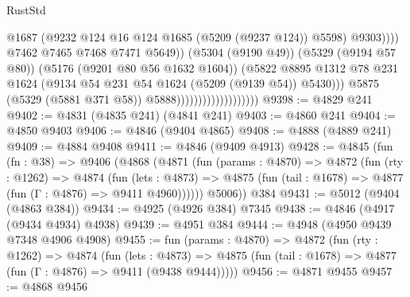 \begin{lexlean}{RustStd}
\begin{coremodule}
                                                        @1687
                                                        (@9232
                                                          @124
                                                          @16
                                                          @124
                                                          @1685
                                                          (@5209 (@9237 @124))
                                                          @5598)
                                                        @9303))))
                                                @7462
                                                @7465
                                                @7468
                                                @7471
                                                @5649))
                                            (@5304 (@9190 @49))
                                            (@5329 (@9194 @57 @80))
                                            (@5176 (@9201 @80 @56 @1632 @1604))
                                            (@5822
                                              @8895
                                              @1312
                                              @78
                                              @231
                                              @1624
                                              (@9134 @54 @231 @54 @1624 (@5209 (@9139 @54)) @5430)))
                                          @5875
                                          (@5329 (@5881 @371 @58))
                                          @5888)))))))))))))))))))
@9398 := @4829 @241
@9402 := @4831 (@4835 @241) (@4841 @241)
@9403 := @4860 @241
@9404 := @4850 @9403
@9406 := @4846 (@9404 @4865)
@9408 := @4888 (@4889 @241)
@9409 := @4884 @9408
@9411 := @4846 (@9409 @4913)
@9428 := @4845
    (fun (fn : @38) =>
    @9406
      (@4868
        (@4871
          (fun (params : @4870) =>
          @4872
            (fun (rty : @1262) =>
            @4874
              (fun (lets : @4873) =>
              @4875 (fun (tail : @1678) => @4877 (fun (Γ : @4876) => @9411 @4960))))))
        @5006))
    @384
@9431 := @5012 (@9404 (@4863 @384))
@9434 := @4925 (@4926 @384) @7345
@9438 := @4846 (@4917 (@9434 @4934) @4938)
@9439 := @4951 @384
@9444 := @4948 (@4950 @9439 @7348 @4906 @4908)
@9455 := fun (params : @4870) =>
  @4872
    (fun (rty : @1262) =>
    @4874
      (fun (lets : @4873) =>
      @4875 (fun (tail : @1678) => @4877 (fun (Γ : @4876) => @9411 (@9438 @9444)))))
@9456 := @4871 @9455
@9457 := @4868 @9456

\end{coremodule}
\end{lexlean}
